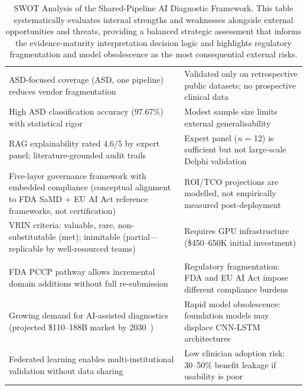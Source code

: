 \begin{table}[!htbp]
\tablestripes\tablefontsize
\tablefontsize
\caption[SWOT Analysis of the Shared-Pipeline AI Diagnostic]{SWOT Analysis of the Shared-Pipeline AI Diagnostic Framework. This table systematically evaluates internal strengths and weaknesses alongside external opportunities and threats, providing a balanced strategic assessment that informs the evidence-maturity interpretation decision logic and highlights regulatory fragmentation and model obsolescence as the most consequential external risks.}
\begin{tabularx}{\textwidth}{@{} L L @{}}
\toprule
{} &  \\
\midrule
ASD-focused coverage (ASD, one pipeline) reduces vendor fragmentation & Validated only on retrospective public datasets; no prospective clinical data \\
\addlinespace
High ASD classification accuracy (97.67\%) with statistical rigor & Modest sample size limits external generalisability \\
\addlinespace
RAG explainability rated 4.6/5 by expert panel; literature-grounded audit trails & Expert panel (\textit{n} = 12) is sufficient but not large-scale Delphi validation \\
\addlinespace
Five-layer governance framework with embedded compliance (conceptual alignment to FDA SaMD + EU AI Act reference frameworks, not certification) & ROI/TCO projections are modelled, not empirically measured post-deployment \\
\addlinespace
VRIN criteria: valuable, rare, non-substitutable (met); inimitable (partial---replicable by well-resourced teams) & Requires GPU infrastructure (\$450--650K initial investment) \\
\midrule
{} &  \\
\midrule
FDA PCCP pathway allows incremental domain additions without full re-submission & Regulatory fragmentation: FDA and EU AI Act impose different compliance burdens \\
\addlinespace
Growing demand for AI-assisted diagnostics (projected \$110--188B market by 2030~\cite{grandview2024aihealthcare}) & Rapid model obsolescence: foundation models may displace CNN-LSTM architectures \\
\addlinespace
Federated learning enables multi-institutional validation without data sharing & Low clinician adoption risk: 30--50\% benefit leakage if usability is poor \\

\end{tabularx}
\end{table}
